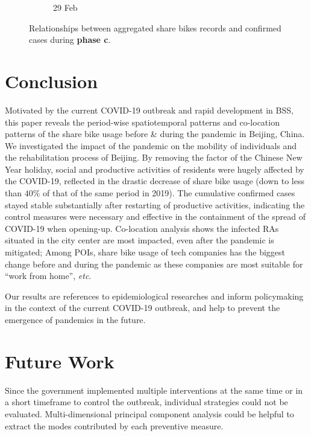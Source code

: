 \documentclass[ijgi,submit,moreauthors,pdftex]{Definitions/mdpi}
\begin{document}
\begin{figure}[!ht]
\begin{subfigure}{.3\textwidth}
\begin{tikzpicture}[inner sep = 0pt]
        \end{tikzpicture}
        \caption{29 Feb}
        \label{fig:correlation_02_29}
    \end{subfigure}
    \caption{Relationships between aggregated share bikes records and confirmed cases during \textbf{phase c}.}
    \label{fig:BSS_phase_3}
\end{figure}


\section{Conclusion}

Motivated by the current COVID-19 outbreak and rapid development in BSS, this paper reveals the period-wise spatiotemporal patterns and co-location patterns of the share bike usage before \& during the pandemic in Beijing, China.
We investigated the impact of the pandemic on the mobility of individuals and the rehabilitation process of Beijing.
By removing the factor of the Chinese New Year holiday, social and productive activities of residents were hugely affected by the COVID-19, reflected in the drastic decrease of share bike usage (down to less than $40\%$ of that of the same period in 2019). 
The cumulative confirmed cases stayed stable substantially after restarting of productive activities, indicating the control measures were necessary and effective in the containment of the spread of COVID-19 when opening-up.
Co-location analysis shows the infected RAs situated in the city center are most impacted, even after the pandemic is mitigated;
Among POIs, share bike usage of tech companies has the biggest change before and during the pandemic as these companies are most suitable for ``work from home'', \textit{etc}.

Our results are references to epidemiological researches and inform policymaking in the context of the current COVID-19 outbreak, and help to prevent the emergence of pandemics in the future.

\section{Future Work}

Since the government implemented multiple interventions at the same time or in a short timeframe to control the outbreak, individual strategies could not be evaluated.
Multi-dimensional principal component analysis could be helpful to extract the modes contributed by each preventive measure.
\end{document}
